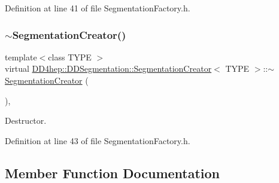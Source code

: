 Definition at line 41 of file Segmentation\+Factory.\+h.

\hypertarget{class_d_d4hep_1_1_d_d_segmentation_1_1_segmentation_creator_abb405dd7c3a0092bfc072e8564dda6af}{}\label{class_d_d4hep_1_1_d_d_segmentation_1_1_segmentation_creator_abb405dd7c3a0092bfc072e8564dda6af} 
\subsubsection{\texorpdfstring{$\sim$\+Segmentation\+Creator()}{~SegmentationCreator()}}
{\footnotesize\ttfamily template$<$class T\+Y\+PE $>$ \\
virtual \hyperlink{class_d_d4hep_1_1_d_d_segmentation_1_1_segmentation_creator}{D\+D4hep\+::\+D\+D\+Segmentation\+::\+Segmentation\+Creator}$<$ T\+Y\+PE $>$\+::$\sim$\hyperlink{class_d_d4hep_1_1_d_d_segmentation_1_1_segmentation_creator}{Segmentation\+Creator} (\begin{DoxyParamCaption}{ }\end{DoxyParamCaption})\hspace{0.3cm}{\ttfamily [inline]}, {\ttfamily [virtual]}}



Destructor. 



Definition at line 43 of file Segmentation\+Factory.\+h.



\subsection{Member Function Documentation}
\hypertarget{class_d_d4hep_1_1_d_d_segmentation_1_1_segmentation_creator_a4d5669cfa65ace8d57f54a04af55e5e2}{}\label{class_d_d4hep_1_1_d_d_segmentation_1_1_segmentation_creator_a4d5669cfa65ace8d57f54a04af55e5e2} 
